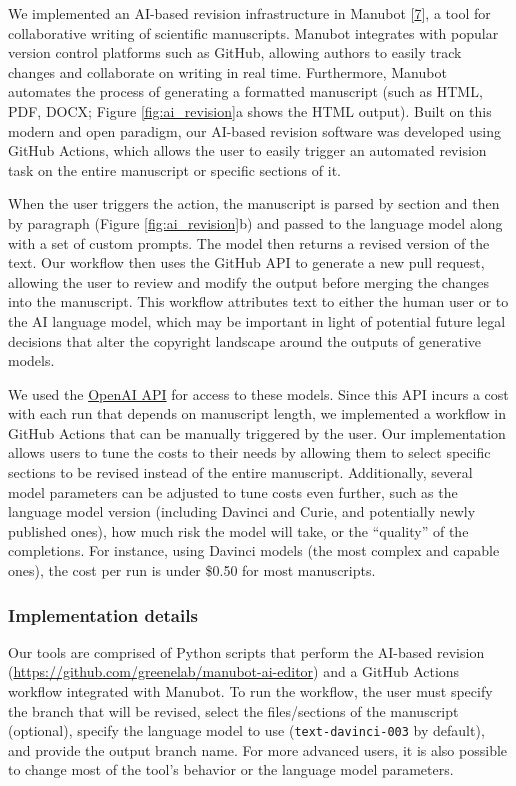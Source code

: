 \documentclass[
]{article}
\begin{document}
We implemented an AI-based revision infrastructure in Manubot {[}\protect\hyperlink{ref-YuJbg3zO}{7}{]}, a tool for collaborative writing of scientific manuscripts.
Manubot integrates with popular version control platforms such as GitHub, allowing authors to easily track changes and collaborate on writing in real time.
Furthermore, Manubot automates the process of generating a formatted manuscript (such as HTML, PDF, DOCX; Figure \ref{fig:ai_revision}a shows the HTML output).
Built on this modern and open paradigm, our AI-based revision software was developed using GitHub Actions, which allows the user to easily trigger an automated revision task on the entire manuscript or specific sections of it.

When the user triggers the action, the manuscript is parsed by section and then by paragraph (Figure \ref{fig:ai_revision}b) and passed to the language model along with a set of custom prompts.
The model then returns a revised version of the text.
Our workflow then uses the GitHub API to generate a new pull request, allowing the user to review and modify the output before merging the changes into the manuscript.
This workflow attributes text to either the human user or to the AI language model, which may be important in light of potential future legal decisions that alter the copyright landscape around the outputs of generative models.

We used the \href{https://openai.com/api/}{OpenAI API} for access to these models.
Since this API incurs a cost with each run that depends on manuscript length, we implemented a workflow in GitHub Actions that can be manually triggered by the user.
Our implementation allows users to tune the costs to their needs by allowing them to select specific sections to be revised instead of the entire manuscript.
Additionally, several model parameters can be adjusted to tune costs even further, such as the language model version (including Davinci and Curie, and potentially newly published ones), how much risk the model will take, or the ``quality'' of the completions.
For instance, using Davinci models (the most complex and capable ones), the cost per run is under \$0.50 for most manuscripts.

\hypertarget{implementation-details}{%
\subsubsection{Implementation details}\label{implementation-details}}

Our tools are comprised of Python scripts that perform the AI-based revision (\url{https://github.com/greenelab/manubot-ai-editor}) and a GitHub Actions workflow integrated with Manubot.
To run the workflow, the user must specify the branch that will be revised, select the files/sections of the manuscript (optional), specify the language model to use (\texttt{text-davinci-003} by default), and provide the output branch name.
For more advanced users, it is also possible to change most of the tool's behavior or the language model parameters.
\end{document}
